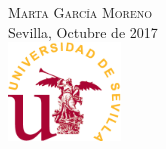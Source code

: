 \begin{titlepage}
\Large %
\textsc{Marta García Moreno}\\[3cm] %


{\large %
Sevilla, Octubre de 2017
}\\[1cm] %


\includegraphics[width=3cm]{logo}\\[1cm] %
 

\vfill %

\cleardoublepage
\thispagestyle{empty}
\end{titlepage}


\raggedbottom



%